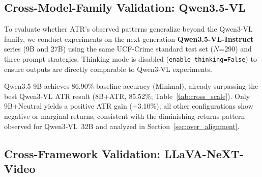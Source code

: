 \subsection{Cross-Model-Family Validation: Qwen3.5-VL}
\label{sec:qwen35}

To evaluate whether ATR's observed patterns generalize beyond the Qwen3-VL family, we conduct experiments on the next-generation \textbf{Qwen3.5-VL-Instruct} series (9B and 27B) using the same UCF-Crime standard test set ($N$=290) and three prompt strategies. Thinking mode is disabled (\texttt{enable\_thinking=False}) to ensure outputs are directly comparable to Qwen3-VL experiments.

\begin{table}[t]
  \centering
  \caption{Qwen3.5-VL on UCF-Crime ($N$=290): Baseline vs.\ ATR.}
  \label{tab:qwen35}
\end{table}

Qwen3.5-9B achieves 86.90\% baseline accuracy (Minimal), already surpassing the best Qwen3-VL ATR result (8B+ATR, 85.52\%; Table~\ref{tab:cross_scale}). Only 9B+Neutral yields a positive ATR gain (+3.10\%); all other configurations show negative or marginal returns, consistent with the diminishing-returns pattern observed for Qwen3-VL~32B and analyzed in Section~\ref{sec:over_alignment}.

\subsection{Cross-Framework Validation: LLaVA-NeXT-Video}
\label{sec:llava_validation}

